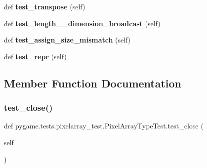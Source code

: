 \begin{DoxyCompactItemize}
\item 
\mbox{\label{classpygame_1_1tests_1_1pixelarray__test_1_1_pixel_array_type_test_a3a2ff3dde5eef0df47fa011ed5a97ddd}} 
def {\bfseries test\+\_\+transpose} (self)
\item 
\mbox{\label{classpygame_1_1tests_1_1pixelarray__test_1_1_pixel_array_type_test_acdf7912b8d350c8580670279cbe4c846}} 
def {\bfseries test\+\_\+length\+\_\+\_\+dimension\+\_\+broadcast} (self)
\item 
\mbox{\label{classpygame_1_1tests_1_1pixelarray__test_1_1_pixel_array_type_test_a2746fa7377ad8cbec3f26305507ef3de}} 
def {\bfseries test\+\_\+assign\+\_\+size\+\_\+mismatch} (self)
\item 
\mbox{\label{classpygame_1_1tests_1_1pixelarray__test_1_1_pixel_array_type_test_a83ee74b59c1319224990f37e90cf3f02}} 
def {\bfseries test\+\_\+repr} (self)
\end{DoxyCompactItemize}


\subsection{Member Function Documentation}
\mbox{\label{classpygame_1_1tests_1_1pixelarray__test_1_1_pixel_array_type_test_ade0c81cfc21235360fe3ac9708746f05}} 
\subsubsection{\texorpdfstring{test\+\_\+close()}{test\_close()}}
{\footnotesize\ttfamily def pygame.\+tests.\+pixelarray\+\_\+test.\+Pixel\+Array\+Type\+Test.\+test\+\_\+close (\begin{DoxyParamCaption}\item[{}]{self }\end{DoxyParamCaption})}

